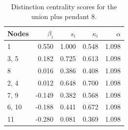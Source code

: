 \begin{table}
\centering
\caption{\label{tab:unionpendant8}Distinction centrality scores for the union plus pendant 8.}
\centering
\begin{tabular}[t]{lrrrr}
\toprule
Nodes & $\beta_i$ & $s_i$ & $\kappa_i$ & $\alpha$\\
\midrule
1 & 0.550 & 1.000 & 0.548 & 1.098\\
3, 5 & 0.182 & 0.725 & 0.613 & 1.098\\
8 & 0.016 & 0.386 & 0.408 & 1.098\\
2, 4 & 0.012 & 0.648 & 0.700 & 1.098\\
7, 9 & -0.149 & 0.382 & 0.568 & 1.098\\
6, 10 & -0.188 & 0.441 & 0.672 & 1.098\\
11 & -0.280 & 0.081 & 0.369 & 1.098\\
\bottomrule
\end{tabular}
\end{table}
